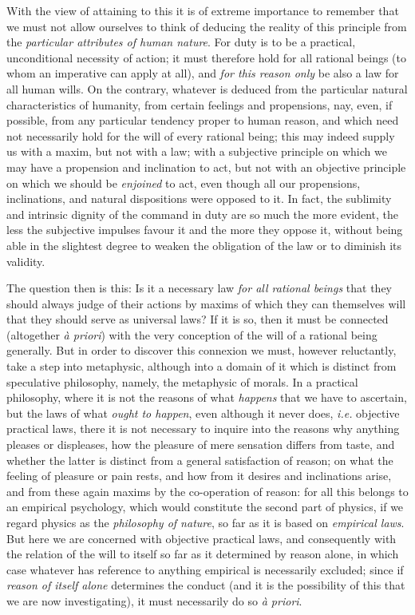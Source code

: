 With the view of attaining to this it is of extreme importance to
remember that we must not allow ourselves to think of deducing the
reality of this principle from the \textit{particular attributes of
human nature}. For duty is to be a practical, unconditional necessity
of action; it must therefore hold for all rational beings (to whom an
imperative can apply at all), and \textit{for this reason only} be
also a law for all human wills. On the contrary, whatever is deduced
from the particular natural characteristics of humanity, from certain
feelings and propensions, nay, even, if possible, from any particular
tendency proper to human reason, and which need not necessarily hold
for the will of every rational being; this may indeed supply us with a
maxim, but not with a law; with a subjective principle on which we may
have a propension and inclination to act, but not with an objective
principle on which we should be \textit{enjoined} to act, even though
all our propensions, inclinations, and natural dispositions were
opposed to it. In fact, the sublimity and intrinsic dignity of the
command in duty are so much the more evident, the less the subjective
impulses favour it and the more they oppose it, without being able in
the slightest degree to weaken the obligation of the law or to
diminish its validity.

\snip

The question then is this: Is it a necessary law \textit{for
all rational beings} that they should always judge of their actions by
maxims of which they can themselves will that they should serve as
universal laws? If it is so, then it must be connected (altogether
\textit{\`a priori}) with the very conception of the will of a
rational being generally. But in order to discover this connexion we
must, however reluctantly, take a step into metaphysic, although into
a domain of it which is distinct from speculative philosophy, namely,
the metaphysic of morals. In  a practical philosophy, where
it is not the reasons of what \textit{happens} that we have to
ascertain, but the laws of what \textit{ought to happen}, even
although it never does, \textit{i.e.} objective practical laws, there
it is not necessary to inquire into the reasons why anything pleases
or displeases, how the pleasure of mere sensation differs from taste,
and whether the latter is distinct from a general satisfaction of
reason; on what the feeling of pleasure or pain rests, and how from it
desires and inclinations arise, and from these again maxims by the
co-operation of reason: for all this belongs to an empirical
psychology, which would constitute the second part of physics, if we
regard physics as the \textit{philosophy of nature}, so far as it is
based on \textit{empirical laws}. But here we are concerned with
objective practical laws, and consequently with the relation of the
will to itself so far as it determined by reason alone, in which case
whatever has reference to anything empirical is necessarily excluded;
since if \textit{reason of itself alone} determines the conduct (and
it is the possibility of this that we are now investigating), it must
necessarily do so \textit{\`a priori}.

